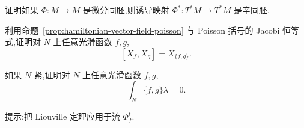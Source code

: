 \begin{exercise}[余切丛上的诱导辛同胚]\label{ex:cotangent-lift-symplectic}
证明如果 $\Phi:M\to M$ 是微分同胚,则诱导映射 $\Phi^*:T^*M\to T^*M$ 是辛同胚.
\end{exercise}

\begin{exercise}\label{ex:hamiltonian-vector-field-bracket}
利用命题~\ref{prop:hamiltonian-vector-field-poisson} 与 Poisson 括号的 Jacobi 恒等式,证明对 $N$ 上任意光滑函数 $f,g$,
\[
 [X_f,X_g]=X_{\{f,g\}}.
\]
\end{exercise}

\begin{exercise}[紧辛流形上的积分恒等式]\label{ex:integral-poisson-zero}
如果 $N$ 紧,证明对 $N$ 上任意光滑函数 $f,g$,
\[
 \int_N\{f,g\}\lambda=0.
\]

提示:把 Liouville 定理应用于流 $\Phi_f^t$.
\end{exercise}
